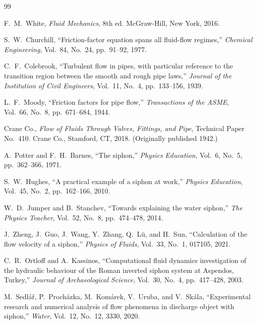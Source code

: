 \documentclass[11pt]{article}
\theoremstyle{definition}
\begin{document}
\begin{thebibliography}{99}

F.~M.~White,
\emph{Fluid Mechanics}, 8th ed.
McGraw-Hill, New York, 2016.

S.~W.~Churchill,
``Friction-factor equation spans all fluid-flow regimes,''
\emph{Chemical Engineering}, Vol.~84, No.~24, pp.~91--92, 1977.

C.~F.~Colebrook,
``Turbulent flow in pipes, with particular reference to the transition region between 
the smooth and rough pipe laws,''
\emph{Journal of the Institution of Civil Engineers}, Vol.~11, No.~4, pp.~133--156, 1939.

L.~F.~Moody,
``Friction factors for pipe flow,''
\emph{Transactions of the ASME}, Vol.~66, No.~8, pp.~671--684, 1944.

Crane Co.,
\emph{Flow of Fluids Through Valves, Fittings, and Pipe}, Technical Paper No.~410.
Crane Co., Stamford, CT, 2018. (Originally published 1942.)

A.~Potter and F.~H.~Barnes,
``The siphon,''
\emph{Physics Education}, Vol.~6, No.~5, pp.~362--366, 1971.

S.~W.~Hughes,
``A practical example of a siphon at work,''
\emph{Physics Education}, Vol.~45, No.~2, pp.~162--166, 2010.

W.~D.~Jumper and B.~Stanchev,
``Towards explaining the water siphon,''
\emph{The Physics Teacher}, Vol.~52, No.~8, pp.~474--478, 2014.

J.~Zheng, J.~Guo, J.~Wang, Y.~Zhang, Q.~L\"u, and H.~Sun,
``Calculation of the flow velocity of a siphon,''
\emph{Physics of Fluids}, Vol.~33, No.~1, 017105, 2021.

C.~R.~Ortloff and A.~Kassinos,
``Computational fluid dynamics investigation of the hydraulic behaviour of the Roman 
inverted siphon system at Aspendos, Turkey,''
\emph{Journal of Archaeological Science}, Vol.~30, No.~4, pp.~417--428, 2003.

M.~Sedl\'a\v{r}, P.~Proch\'azka, M.~Kom\'arek, V.~Uruba, and V.~Sk\'ala,
``Experimental research and numerical analysis of flow phenomena in discharge object 
with siphon,''
\emph{Water}, Vol.~12, No.~12, 3330, 2020.


\end{thebibliography}
\end{document}
